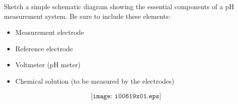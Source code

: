 

Sketch a simple schematic diagram showing the essential components of a pH measurement system.  Be sure to include these elements:

\begin{itemize}
\item{} Measurement electrode
\item{} Reference electrode
\item{} Voltmeter (pH meter)
\item{} Chemical solution (to be measured by the electrodes)
\end{itemize}

\vskip 200pt







$$\texttt{[image: i00619x01.eps]}$$











